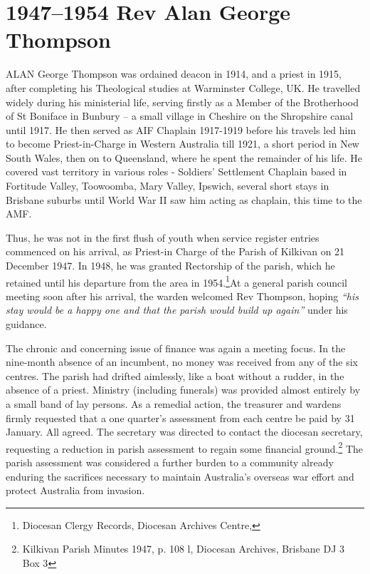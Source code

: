 \balance


\printendnotes[custom]
\setcounter{endnote}{0}




\chapter{1947--1954 Rev Alan George Thompson}
\nobalance


\lettrine[lines=3]{A}{LAN}
 George Thompson was ordained deacon in 1914, and a priest in 1915, after completing his Theological studies at Warminster College, UK. He travelled widely during his ministerial life, serving firstly as a Member of the Brotherhood of St Boniface in Bunbury -- a small village in Cheshire on the Shropshire canal until 1917. He then served as AIF Chaplain 1917-1919 before his travels led him to become Priest-in-Charge in Western Australia till 1921, a short period in New South Wales, then on to Queensland, where he spent the remainder of his life. He covered vast territory in various roles - Soldiers' Settlement Chaplain based in Fortitude Valley, Toowoomba, Mary Valley, Ipswich, several short stays in Brisbane suburbs until World War II saw him acting as chaplain, this time to the AMF.

Thus, he was not in the first flush of youth when service register entries commenced on his arrival, as Priest-in Charge of the Parish of Kilkivan on 21 December 1947. In 1948, he was granted Rectorship of the parish, which he retained until his departure from the area in 1954.\footnote{Diocesan Clergy Records, Diocesan Archives Centre,}At a general parish council meeting soon after his arrival, the warden welcomed Rev Thompson, hoping \emph{``his stay would be a happy one and that the parish would build up again''} under his guidance.


The chronic and concerning issue of finance was again a meeting focus. In the nine-month absence of an incumbent, no money was received from any of the six centres. The parish had drifted aimlessly, like a boat without a rudder, in the absence of a priest. Ministry (including funerals) was provided almost entirely by a small band of lay persons. As a remedial action, the treasurer and wardens firmly requested that a one quarter's assessment from each centre be paid by 31 January. All agreed. The secretary was directed to contact the diocesan secretary, requesting a reduction in parish assessment to regain some financial ground.\footnote{Kilkivan Parish Minutes 1947, p. 108 l, Diocesan Archives, Brisbane DJ 3 Box 3} The parish assessment was considered a further burden to a community already enduring the sacrifices necessary to maintain Australia's overseas war effort and protect Australia from invasion.


